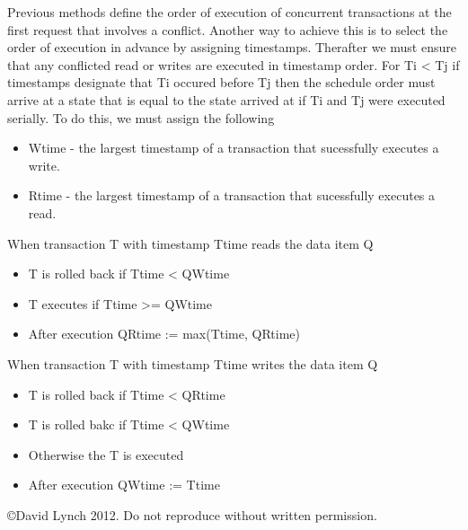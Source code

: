 \documentclass[10pt,a4paper]{article}
\begin{document}
\newline\newline
Previous methods define the order of execution of concurrent transactions at the first request that involves a conflict. Another way to achieve this is to select the order of execution in advance by assigning timestamps. Therafter we must ensure that any conflicted read or writes are executed in timestamp order. For Ti < Tj if timestamps designate that Ti occured before Tj then the schedule order must arrive at a state that is equal to the state arrived at if Ti and Tj were executed serially. 
\newline\newline
To do this, we must assign the following 
\begin{itemize}
\item Wtime - the largest timestamp of a transaction that sucessfully executes a write.
\item Rtime - the largest timestamp of a transaction that sucessfully executes a read. 
\end{itemize} 
When transaction T with timestamp Ttime reads the data item Q 
\begin{itemize}
\item T is rolled back if Ttime < QWtime
\item T executes if Ttime >= QWtime
\item After execution QRtime := max(Ttime, QRtime)
\end{itemize}
When transaction T with timestamp Ttime writes the data item Q
\begin{itemize}
\item T is rolled back if Ttime < QRtime
\item T is rolled bakc if Ttime < QWtime 
\item Otherwise the T is executed 
\item After execution QWtime := Ttime
\end{itemize}

{}

\begin{center}
{\small \copyright  David Lynch 2012. Do not reproduce without written permission.}
\end{center}
\end{document}
